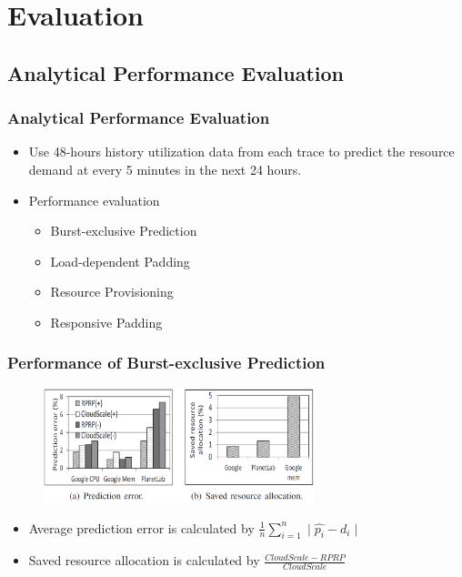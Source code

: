 \documentclass{beamer}
\begin{document}
\section{Evaluation}

\subsection{Analytical Performance Evaluation}
	\begin{frame}
	\frametitle{Analytical Performance Evaluation}
		\begin{itemize}
		\item Use 48-hours history utilization data from each trace to predict the resource demand at every 5 minutes in the next 24 hours.
		\item Performance evaluation
			\begin{itemize}
			\item Burst-exclusive Prediction
			\item Load-dependent Padding
			\item Resource Provisioning
			\item Responsive Padding
			\end{itemize}
		\end{itemize}
	\end{frame}

	\begin{frame}
	\frametitle{Performance of Burst-exclusive Prediction}
		\begin{figure}[h!]
		\centering
		\includegraphics[width=0.7\textwidth]{./figure/eva1_1.PNG}
		\end{figure}
		\begin{itemize}
		\item Average prediction error is calculated by $\frac{1}{n}\sum_{i=1}^{n}\mid \hat{p_{i}}-d_{i} \mid$
		\item Saved resource allocation is calculated by $\frac{CloudScale-RPRP}{CloudScale}$
		\end{itemize}
	\end{frame}
\end{document}
